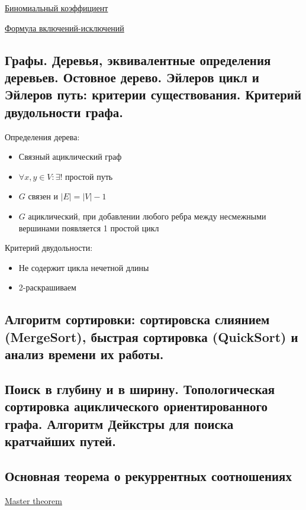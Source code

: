 \documentclass{article}
\begin{document}
\href{https://ru.wikipedia.org/wiki/%D0%91%D0%B8%D0%BD%D0%BE%D0%BC%D0%B8%D0%B0%D0%BB%D1%8C%D0%BD%D1%8B%D0%B9_%D0%BA%D0%BE%D1%8D%D1%84%D1%84%D0%B8%D1%86%D0%B8%D0%B5%D0%BD%D1%82}{Биномиальный коэффициент}

\href{https://mk.cs.msu.ru/images/f/f0/Dm2-lect2-selezn.pdf}{Формула включений-исключений}


\subsection{Графы. Деревья, эквивалентные определения деревьев. Остовное
дерево. Эйлеров цикл и Эйлеров путь: критерии существования.
Критерий двудольности графа.}

Определения дерева:
\begin{itemize}
    \item Связный ациклический граф
    \item $\forall x, y \in V : \exists!$ простой путь
    \item $G$ связен и $|E| = |V| - 1$
    \item $G$ ациклический, при добавлении любого ребра между несмежными вершинами появляется 1 простой цикл
\end{itemize}

Критерий двудольности:
\begin{itemize}
    \item Не содержит цикла нечетной длины
    \item 2-раскрашиваем
\end{itemize}

\subsection{Алгоритм сортировки: сортировска слиянием (MergeSort),
быстрая сортировка (QuickSort) и анализ времени их работы.}

\subsection{Поиск в глубину и в ширину. Топологическая сортировка
ациклического ориентированного графа. Алгоритм Дейкстры для
поиска кратчайших путей.}

\subsection{Основная теорема о рекуррентных соотношениях}

\href{https://neerc.ifmo.ru/wiki/index.php?title=%D0%9C%D0%B0%D1%81%D1%82%D0%B5%D1%80-%D1%82%D0%B5%D0%BE%D1%80%D0%B5%D0%BC%D0%B0}{Master theorem}
\end{document}
